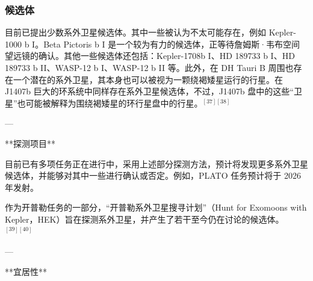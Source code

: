 \subsubsection{候选体}
目前已提出少数系外卫星候选体。其中一些被认为不太可能存在，例如 Kepler-1000 b I。Beta Pictoris b I 是一个较为有力的候选体，正等待詹姆斯·韦布空间望远镜的确认。其他一些候选体还包括：Kepler-1708b I、HD 189733 b I、HD 189733 b II、WASP-12 b I、WASP-12 b II 等。此外，在 DH Tauri B 周围也存在一个潜在的系外卫星，其本身也可以被视为一颗绕褐矮星运行的行星。在 J1407b 巨大的环系统中同样存在系外卫星候选体，不过，J1407b 盘中的这些“卫星”也可能被解释为围绕褐矮星的环行星盘中的行星。$^{[37][38]}$

---

**探测项目**

目前已有多项任务正在进行中，采用上述部分探测方法，预计将发现更多系外卫星候选体，并能够对其中一些进行确认或否定。例如，PLATO 任务预计将于 2026 年发射。

作为开普勒任务的一部分，“开普勒系外卫星搜寻计划”（Hunt for Exomoons with Kepler，HEK）旨在探测系外卫星，并产生了若干至今仍在讨论的候选体。$^{[39][40]}$

---

**宜居性**
